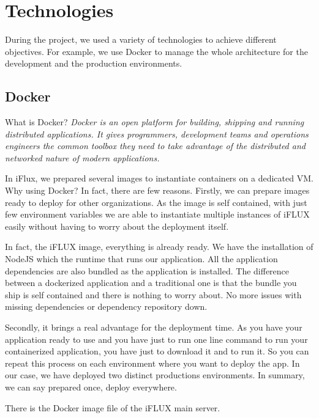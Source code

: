 \section{Technologies}

During the project, we used a variety of technologies to achieve different objectives. For example, we use Docker to manage the whole architecture for the development and the production environments.

\subsection{Docker}

What is Docker? \emph{Docker is an open platform for building, shipping and running distributed applications. It gives programmers, development teams and operations engineers the common toolbox they need to take advantage of the distributed and networked nature of modern applications.}

In iFlux, we prepared several images to instantiate containers on a dedicated VM. Why using Docker? In fact, there are few reasons. Firstly, we can prepare images ready to deploy for other organizations. As the image is self contained, with just few environment variables we are able to instantiate multiple instances of iFLUX easily without having to worry about the deployment itself.

In fact, the iFLUX image, everything is already ready. We have the installation of NodeJS which the runtime that runs our application. All the application dependencies are also bundled as the application is installed. The difference between a dockerized application and a traditional one is that the bundle you ship is self contained and there is nothing to worry about. No more issues with missing dependencies or dependency repository down.

Secondly, it brings a real advantage for the deployment time. As you have your application ready to use and you have just to run one line command to run your containerized application, you have just to download it and to run it. So you can repeat this process on each environment where you want to deploy the app. In our case, we have deployed two distinct productions environments. In summary, we can say prepared once, deploy everywhere.

There is the Docker image file of the iFLUX main server.

